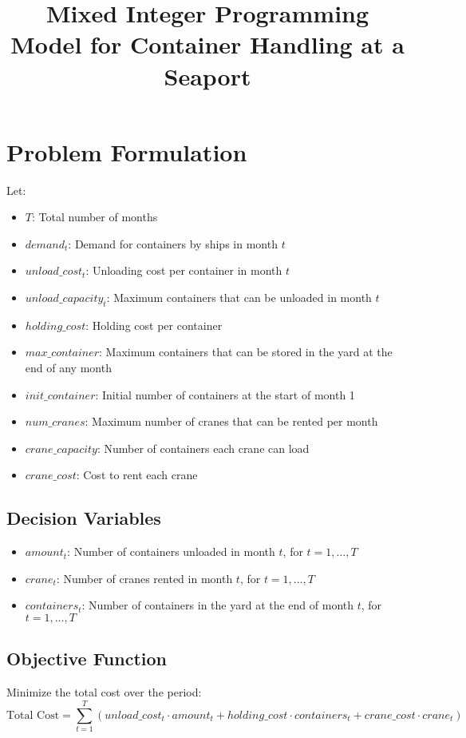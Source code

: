 \documentclass{article}
\begin{document}
\title{Mixed Integer Programming Model for Container Handling at a Seaport}
\author{}
\date{}
\maketitle

\section*{Problem Formulation}

Let:
\begin{itemize}
    \item $T$: Total number of months
    \item $demand_{t}$: Demand for containers by ships in month $t$
    \item $unload\_cost_{t}$: Unloading cost per container in month $t$
    \item $unload\_capacity_{t}$: Maximum containers that can be unloaded in month $t$
    \item $holding\_cost$: Holding cost per container
    \item $max\_container$: Maximum containers that can be stored in the yard at the end of any month
    \item $init\_container$: Initial number of containers at the start of month 1
    \item $num\_cranes$: Maximum number of cranes that can be rented per month
    \item $crane\_capacity$: Number of containers each crane can load
    \item $crane\_cost$: Cost to rent each crane
\end{itemize}

\subsection*{Decision Variables}
\begin{itemize}
    \item $amount_{t}$: Number of containers unloaded in month $t$, for $t=1,\ldots,T$
    \item $crane_{t}$: Number of cranes rented in month $t$, for $t=1,\ldots,T$
    \item $containers_{t}$: Number of containers in the yard at the end of month $t$, for $t=1,\ldots,T$
\end{itemize}

\subsection*{Objective Function}
Minimize the total cost over the period:
\[
\text{Total Cost} = \sum_{t=1}^{T} \left( unload\_cost_{t} \cdot amount_{t} + holding\_cost \cdot containers_{t} + crane\_cost \cdot crane_{t} \right)
\]
\end{document}
